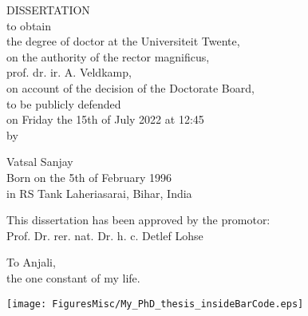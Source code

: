 \newpage
\thispagestyle{empty}
\vspace{1cm}
\begin{center}
{\Large \textsc{\thesistitle}}

\vspace{1cm}

DISSERTATION\\

\vspace{10mm}
to obtain\\
the degree of doctor at the Universiteit Twente,\\
on the authority of the rector magnificus,\\
prof. dr. ir. A. Veldkamp,\\
on account of the decision of the Doctorate Board,\\
to be publicly defended\\
on Friday the 15th of July 2022 at 12:45\\

\vspace{0.5cm}
by

\vspace{0.5cm}

Vatsal Sanjay\\
Born on the 5th of February 1996\\
in RS Tank Laheriasarai, Bihar, India\\

\newpage
\thispagestyle{empty}

This dissertation has been approved by the promotor:\\
\vspace{0.5cm}
Prof. Dr. rer. nat. Dr. h. c. Detlef Lohse

\newpage
\thispagestyle{empty}

To Anjali,\\
the one constant of my life.
\newpage
\thispagestyle{empty}

\texttt{[image: FiguresMisc/My\_PhD\_thesis\_insideBarCode.eps]}
\end{center}